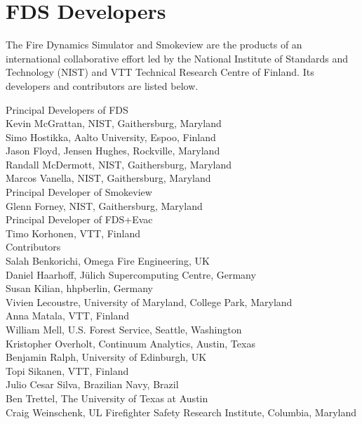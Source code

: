 \chapter{FDS Developers}

The Fire Dynamics Simulator and Smokeview are the products of an international collaborative effort led by
the National Institute of Standards and Technology (NIST) and VTT Technical Research Centre of Finland. Its developers and
contributors are listed below.

\vspace{0.3in}

\begin{flushleft}

Principal Developers of FDS  \\ [0.2in]

Kevin McGrattan, NIST, Gaithersburg, Maryland \\
Simo Hostikka, Aalto University, Espoo, Finland \\
Jason Floyd, Jensen Hughes, Rockville, Maryland \\
Randall McDermott, NIST, Gaithersburg, Maryland \\
Marcos Vanella, NIST, Gaithersburg, Maryland \\ [0.3in]

Principal Developer of Smokeview  \\ [0.2in]

Glenn Forney, NIST, Gaithersburg, Maryland \\ [0.3in]

Principal Developer of FDS+Evac  \\ [0.2in]

Timo Korhonen, VTT, Finland \\ [0.3in]

Contributors \\ [0.2in]

Salah Benkorichi, Omega Fire Engineering, UK \\
Daniel Haarhoff, J\"ulich Supercomputing Centre, Germany \\
Susan Kilian, hhpberlin, Germany \\
Vivien Lecoustre, University of Maryland, College Park, Maryland \\
Anna Matala, VTT, Finland \\
William Mell, U.S. Forest Service, Seattle, Washington \\
Kristopher Overholt, Continuum Analytics, Austin, Texas \\
Benjamin Ralph, University of Edinburgh, UK \\
Topi Sikanen, VTT, Finland \\
Julio Cesar Silva, Brazilian Navy, Brazil \\
Ben Trettel, The University of Texas at Austin \\
Craig Weinschenk, UL Firefighter Safety Research Institute, Columbia, Maryland

\end{flushleft}


